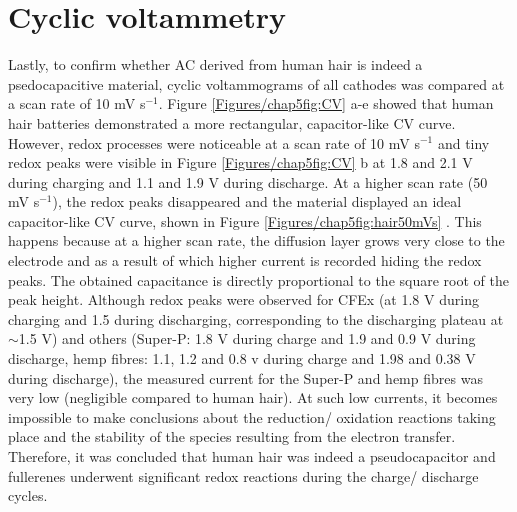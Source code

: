 \section*{Cyclic voltammetry}
Lastly, to confirm whether AC derived from human hair is indeed a psedocapacitive material, cyclic voltammograms of all cathodes was compared at a scan rate of 10 mV s$^{-1}$. Figure \ref{Figures/chap5fig:CV} a-e showed that human hair batteries demonstrated a more rectangular, capacitor-like CV curve. However, redox processes were noticeable at a scan rate of 10 mV s$^{-1}$ and tiny redox peaks were visible in Figure \ref{Figures/chap5fig:CV} b at 1.8 and 2.1 V during charging and 1.1 and 1.9 V during discharge. At a higher scan rate (50 mV s$^{-1}$), the redox peaks disappeared and the material displayed an ideal capacitor-like CV curve, shown in Figure \ref{Figures/chap5fig:hair50mVs} \cite{guan_capacitive_2016, dupont_separating_2015}. This happens because at a higher scan rate, the diffusion layer grows very close to the electrode and as a result of which higher current is recorded hiding the redox peaks. The obtained capacitance is directly proportional to the square root of the peak height. Although redox peaks were observed for CFEx (at 1.8 V during charging and 1.5 during discharging, corresponding to the discharging plateau at $\sim$1.5 V) and others (Super-P: 1.8 V during charge and 1.9 and 0.9 V during discharge, hemp fibres: 1.1, 1.2 and 0.8 v during charge and 1.98 and 0.38 V during discharge), the measured current for the Super-P and hemp fibres was very low (negligible compared to human hair). At such low currents, it becomes impossible to make conclusions about the reduction/ oxidation reactions taking place and the stability of the species resulting from the electron transfer. Therefore, it was concluded that human hair was indeed a pseudocapacitor and fullerenes underwent significant redox reactions during the charge/ discharge cycles.

